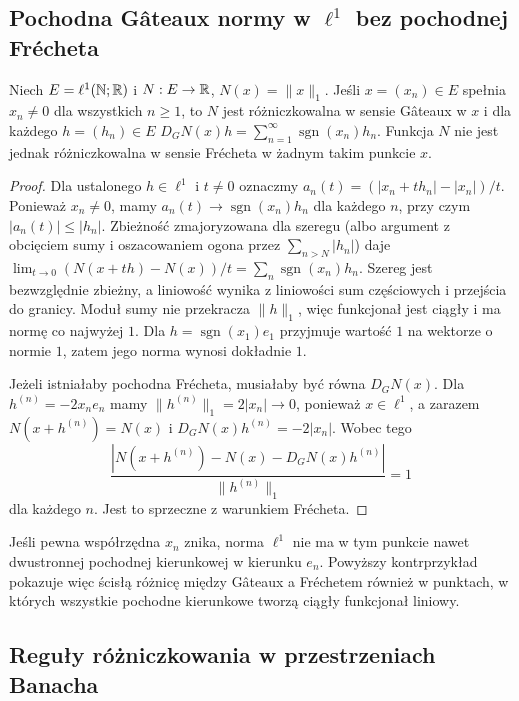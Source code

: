 \subsection{Pochodna Gâteaux normy w \texorpdfstring{$\ell^1$}{ell1} bez pochodnej Frécheta}

\begin{twierdzenie}
\label{thm:l1-gateaux14}
Niech $E=\ell^1(\mathbb N;\mathbb R)$ i $N:E\to\mathbb R$, $N(x)=\|x\|_1$. Jeśli $x=(x_n)\in E$ spełnia $x_n\ne0$ dla wszystkich $n\ge1$, to $N$ jest różniczkowalna w sensie Gâteaux w $x$ i dla każdego $h=(h_n)\in E$
$D_GN(x)h=\sum_{n=1}^\infty \operatorname{sgn}(x_n)h_n$.
Funkcja $N$ nie jest jednak różniczkowalna w sensie Frécheta w żadnym takim punkcie $x$.
\end{twierdzenie}
\begin{proof}
Dla ustalonego $h\in\ell^1$ i $t\ne0$ oznaczmy $a_n(t)=(|x_n+th_n|-|x_n|)/t$. Ponieważ $x_n\ne0$, mamy $a_n(t)\to\operatorname{sgn}(x_n)h_n$ dla każdego $n$, przy czym $|a_n(t)|\le|h_n|$. Zbieżność zmajoryzowana dla szeregu (albo argument z obcięciem sumy i oszacowaniem ogona przez $\sum_{n>N}|h_n|$) daje
$\lim_{t\to0}(N(x+th)-N(x))/t=\sum_n \operatorname{sgn}(x_n)h_n$.
Szereg jest bezwzględnie zbieżny, a liniowość wynika z liniowości sum częściowych i przejścia do granicy. Moduł sumy nie przekracza $\|h\|_1$, więc funkcjonał jest ciągły i ma normę co najwyżej $1$. Dla $h=\operatorname{sgn}(x_1)e_1$ przyjmuje wartość $1$ na wektorze o normie $1$, zatem jego norma wynosi dokładnie $1$.

Jeżeli istniałaby pochodna Frécheta, musiałaby być równa $D_GN(x)$. Dla $h^{(n)}=-2x_ne_n$ mamy $\|h^{(n)}\|_1=2|x_n|\to0$, ponieważ $x\in\ell^1$, a zarazem $N(x+h^{(n)})=N(x)$ i $D_GN(x)h^{(n)}=-2|x_n|$. Wobec tego
\[
\frac{|N(x+h^{(n)})-N(x)-D_GN(x)h^{(n)}|}{\|h^{(n)}\|_1}=1
\]
dla każdego $n$. Jest to sprzeczne z warunkiem Frécheta.
\end{proof}

\begin{uwaga}
Jeśli pewna współrzędna $x_n$ znika, norma $\ell^1$ nie ma w tym punkcie nawet dwustronnej pochodnej kierunkowej w kierunku $e_n$. Powyższy kontrprzykład pokazuje więc ścisłą różnicę między Gâteaux a Fréchetem również w punktach, w których wszystkie pochodne kierunkowe tworzą ciągły funkcjonał liniowy.
\end{uwaga}

\subsection{Reguły różniczkowania w przestrzeniach Banacha}

